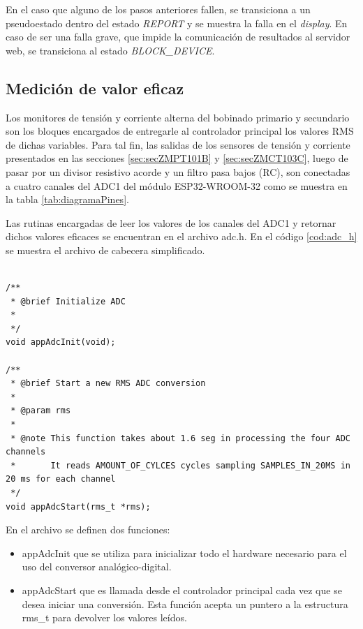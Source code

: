 En el caso que alguno de los pasos anteriores fallen, se transiciona a un pseudoestado dentro del estado \textit{REPORT} y se muestra la falla en el \textit{display}. En caso de ser una falla grave, que impide la comunicación de resultados al servidor web, se transiciona al estado \textit{BLOCK\_DEVICE}.

\subsection{Medición de valor eficaz}
\label{subsec:RMS}

Los monitores de tensión y corriente alterna del bobinado primario y secundario son los bloques encargados de entregarle al controlador principal los valores RMS de dichas variables. Para tal fin, las salidas de los sensores de tensión y corriente presentados en las secciones \ref{sec:secZMPT101B} y \ref{sec:secZMCT103C}, luego de pasar por un divisor resistivo acorde y un filtro pasa bajos (RC), son conectadas a cuatro canales del ADC1 del módulo ESP32-WROOM-32 como se muestra en la tabla \ref{tab:diagramaPines}.

Las rutinas encargadas de leer los valores de los canales del ADC1 y retornar dichos valores eficaces se encuentran en el archivo adc.h. En el código \ref{cod:adc_h} se muestra el archivo de cabecera simplificado. 

\begin{lstlisting}[label=cod:adc_h,caption=Pseudocódigo del módulo adc.h.] % Start your code-block

/**
 * @brief Initialize ADC 
 * 
 */
void appAdcInit(void);

/**
 * @brief Start a new RMS ADC conversion
 * 
 * @param rms
 *
 * @note This function takes about 1.6 seg in processing the four ADC channels
 *       It reads AMOUNT_OF_CYLCES cycles sampling SAMPLES_IN_20MS in 20 ms for each channel
 */
void appAdcStart(rms_t *rms);

\end{lstlisting}

En el archivo se definen dos funciones:
\begin{itemize}
\item appAdcInit que se utiliza para inicializar todo el hardware necesario para el uso del conversor analógico-digital.
\item appAdcStart que es llamada desde el controlador principal cada vez que se desea iniciar una conversión. Esta función acepta un puntero a la estructura rms\_t para devolver los valores leídos. 
\end{itemize}

